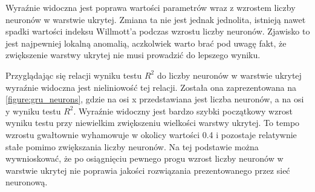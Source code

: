 \documentclass[10pt,a4paper]{article}
\begin{document}
Wyraźnie widoczna jest poprawa wartości parametrów wraz z wzrostem liczby neuronów w warstwie ukrytej. Zmiana ta nie jest jednak jednolita, istnieją nawet spadki wartości indeksu Willmott'a podczas wzrostu liczby neuronów. Zjawisko to jest najpewniej lokalną anomalią, aczkolwiek warto brać pod uwagę fakt, że zwiększenie warstwy ukrytej nie musi prowadzić do lepszego wyniku. 

Przyglądając się relacji wyniku testu $R^2$ do liczby neuronów w warstwie ukrytej wyraźnie widoczna jest nieliniowość tej relacji. Została ona zaprezentowana na \autoref{figure:gru_neurons}, gdzie na osi x przedstawiana jest liczba neuronów, a na osi y wyniku testu $R^2$. Wyraźnie widoczny jest bardzo szybki początkowy wzrost wyniku testu przy niewielkim zwiększeniu wielkości warstwy ukrytej. To tempo wzrostu gwałtownie wyhamowuje w okolicy wartości 0.4 i pozostaje relatywnie stałe pomimo zwiększania liczby neuronów. Na tej podstawie można wywnioskować, że po osiągnięciu pewnego progu wzrost liczby neuronów w warstwie ukrytej nie poprawia jakości rozwiązania prezentowanego przez sieć neuronową. 
\end{document}

